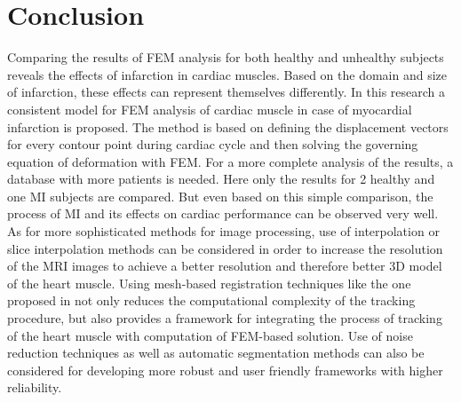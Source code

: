 \documentclass{jicspack}
\begin{document}
\section{Conclusion}
Comparing the results of FEM analysis for both healthy and unhealthy subjects reveals the
effects of infarction in cardiac muscles. Based on the domain and size of infarction, these effects can represent
themselves differently. In this research a consistent model for FEM analysis of cardiac
muscle in case of myocardial infarction is proposed. 
The method is based on defining the displacement vectors for every contour point during
cardiac cycle and then solving the governing equation of deformation with FEM. For a more
complete analysis of the results, a database with more patients is needed. Here only the results for 2 healthy and one MI subjects are compared. But even based on
this simple comparison, the process of MI and its effects on cardiac performance can be
observed very well. As for more sophisticated methods for image processing, use of interpolation or slice interpolation methods \cite{24, 25} can be considered in order to increase the resolution of the MRI images to achieve a better resolution and therefore better 3D model of the heart muscle. Using mesh-based registration techniques like the one proposed in \cite{26} not only reduces the computational complexity of the tracking procedure, but also provides a framework for integrating the process of tracking of the heart muscle with computation of FEM-based solution. Use of noise reduction techniques \cite{27,28} as well as automatic segmentation methods \cite{29} can also be considered for developing more robust and user friendly frameworks with higher reliability. 
\end{document}
